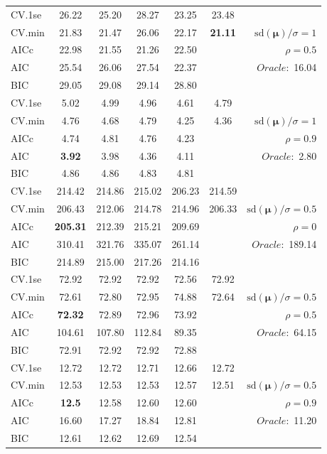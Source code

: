\begin{table}
\begin{center}
\begin{tabular}{l*{5}{c}|r}
 \hline 
CV.1se & 26.22 & 25.20 & 28.27 & 23.25 & 23.48 & \\
CV.min & 21.83 & 21.47 & 26.06 & 22.17 & {\bf 21.11} &  $\mathrm{sd}(\mathbf{\mu})/\sigma=1$ \\
AICc & 22.98 & 21.55 & 21.26 & 22.50 & & $\rho=0.5$ \\
AIC & 25.54 & 26.06 & 27.54 & 22.37 & &  \multirow{2}{*}{$Oracle: $ 16.04} \\
BIC & 29.05 & 29.08 & 29.14 & 28.80 & &  \\
 \hline 
CV.1se & 5.02 & 4.99 & 4.96 & 4.61 & 4.79 & \\
CV.min & 4.76 & 4.68 & 4.79 & 4.25 & 4.36 &  $\mathrm{sd}(\mathbf{\mu})/\sigma=1$ \\
AICc & 4.74 & 4.81 & 4.76 & 4.23 & & $\rho=0.9$ \\
AIC & {\bf 3.92} & 3.98 & 4.36 & 4.11 & &  \multirow{2}{*}{$Oracle: $ 2.80} \\
BIC & 4.86 & 4.86 & 4.83 & 4.81 & &  \\
 \hline 
CV.1se & 214.42 & 214.86 & 215.02 & 206.23 & 214.59 & \\
CV.min & 206.43 & 212.06 & 214.78 & 214.96 & 206.33 &  $\mathrm{sd}(\mathbf{\mu})/\sigma=0.5$ \\
AICc & {\bf 205.31} & 212.39 & 215.21 & 209.69 & & $\rho=0$ \\
AIC & 310.41 & 321.76 & 335.07 & 261.14 & &  \multirow{2}{*}{$Oracle: $ 189.14} \\
BIC & 214.89 & 215.00 & 217.26 & 214.16 & &  \\
 \hline 
CV.1se & 72.92 & 72.92 & 72.92 & 72.56 & 72.92 & \\
CV.min & 72.61 & 72.80 & 72.95 & 74.88 & 72.64 &  $\mathrm{sd}(\mathbf{\mu})/\sigma=0.5$ \\
AICc & {\bf 72.32} & 72.89 & 72.96 & 73.92 & & $\rho=0.5$ \\
AIC & 104.61 & 107.80 & 112.84 & 89.35 & &  \multirow{2}{*}{$Oracle: $ 64.15} \\
BIC & 72.91 & 72.92 & 72.92 & 72.88 & &  \\
 \hline 
CV.1se & 12.72 & 12.72 & 12.71 & 12.66 & 12.72 & \\
CV.min & 12.53 & 12.53 & 12.53 & 12.57 & 12.51 &  $\mathrm{sd}(\mathbf{\mu})/\sigma=0.5$ \\
AICc & {\bf 12.5} & 12.58 & 12.60 & 12.60 & & $\rho=0.9$ \\
AIC & 16.60 & 17.27 & 18.84 & 12.81 & &  \multirow{2}{*}{$Oracle: $ 11.20} \\
BIC & 12.61 & 12.62 & 12.69 & 12.54 & &  \\
 \hline 
\end{tabular}
\end{center}
\vspace{-1cm}
\end{table}





